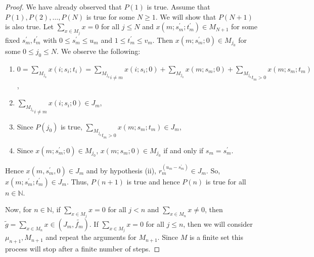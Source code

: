 \documentclass[10pt,a4paper]{amsart}
\newcommand{\bN}{\mathbb N}
\begin{document}
\begin{proof}
\noindent
We have already observed that $P(1)$ is true. Assume that $P(1),P(2),\dots,P(N)$ is true for some $N\geqslant 1$. We will show that $P(N+1)$ is also true. Let ${\underset{x\in M_j}\sum}x=0$ for all $j\leqslant N$ and $x(m;s_m^{'};t_m^{'})\in M_{N+1}$ for some fixed $s_m^{'},t_m^{'}$ with $0\leqslant s_m^{'}\leqslant u_m$ and $1\leqslant t_m^{'}\leqslant v_m$. Then $x(m;s_m^{'};0)\in M_{j_0}$ for some $0\leqslant j_0\leqslant N$. We observe the following:
\begin{enumerate}
	\item $0={\underset{M_{j_0}}\sum}x(i;s_i;t_i)={\underset{i\neq m}{\underset{M_{j_0}}\sum}}x(i;s_i;0)+{\underset{M_{j_0}}\sum}x(m;s_m;0)+{\underset{t_m>0}{\underset{M_{j_0}}\sum}}x(m;s_m;t_m)$,
	\item ${\underset{i\neq m}{\underset{M_{j_0}}\sum}}x(i;s_i;0)\in J_m$,
	\item Since $P(j_0)$ is true, ${\underset{t_m> 0}{\underset{M_{j_0}}\sum}}x(m;s_m;t_m)\in J_m$,
	\item Since $x(m;s_m^{'};0)\in M_{j_0}$, $x(m;s_m;0)\in M_{j_0}$ if and only if $s_m=s_m^{'}$.
\end{enumerate}
\medskip\noindent 
Hence $x(m,s_m^{'},0)\in J_m$ and  by hypothesis (ii), $r_m^{(u_m-s_m^{'})}\in J_m$. So, $x(m;s_m^{'};t_m^{'})\in J_m$. Thus, $P(n+1)$ is true and hence $P(n)$ is true for all $n\in\bN$.

\medskip\noindent
Now, for $n\in\bN$, if ${\underset{x\in M_j}\sum}x= 0$ for all $j<n$ and ${\underset{x\in M_n}\sum}x\neq 0$, then $\widetilde{g}={\underset{x\in M_n}\sum}x\in(J_m,\widetilde{f_m})$. If ${\underset{x\in M_j}\sum}x=0$ for all $j\leqslant n$, then we will consider $\mu_{n+1},M_{n+1}$ and repeat the arguments for $M_{n+1}$. Since $M$ is a finite set this process will stop after a finite number of steps.
\end{proof}
\end{document}
